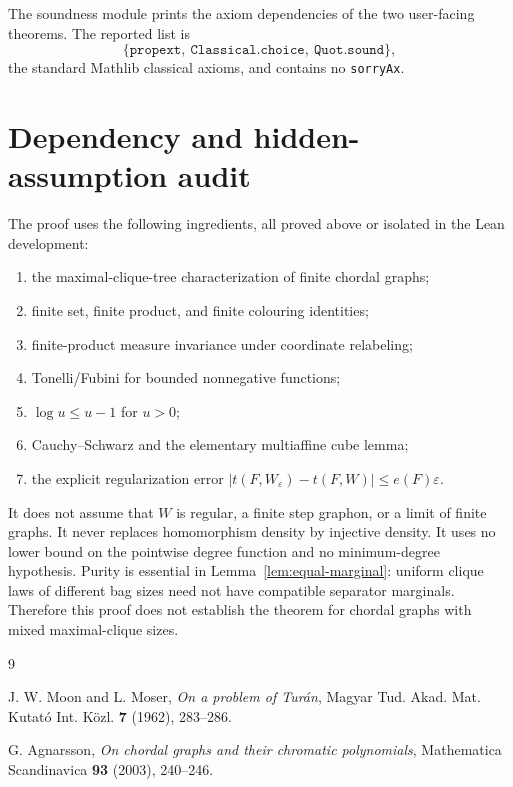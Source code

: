 \documentclass[11pt]{article}
\begin{document}
The soundness module
 prints the axiom
dependencies of the two user-facing theorems.  The reported list is
\[
    \{\texttt{propext},\ \texttt{Classical.choice},\
      \texttt{Quot.sound}\},
\]
the standard Mathlib classical axioms, and contains no \texttt{sorryAx}.

\section{Dependency and hidden-assumption audit}

The proof uses the following ingredients, all proved above or isolated in the
Lean development:
\begin{enumerate}
    \item the maximal-clique-tree characterization of finite chordal graphs;
    \item finite set, finite product, and finite colouring identities;
    \item finite-product measure invariance under coordinate relabeling;
    \item Tonelli/Fubini for bounded nonnegative functions;
    \item \(\log u\le u-1\) for \(u>0\);
    \item Cauchy--Schwarz and the elementary multiaffine cube lemma;
    \item the explicit regularization error
    \(|t(F,W_\varepsilon)-t(F,W)|\le e(F)\varepsilon\).
\end{enumerate}

It does not assume that \(W\) is regular, a finite step graphon, or a limit of
finite graphs.  It never replaces homomorphism density by injective density.
It uses no lower bound on the pointwise degree function and no minimum-degree
hypothesis.  Purity is essential in Lemma~\ref{lem:equal-marginal}: uniform
clique laws of different bag sizes need not have compatible separator
marginals.  Therefore this proof does not establish the theorem for chordal
graphs with mixed maximal-clique sizes.

\begin{thebibliography}{9}

J. W. Moon and L. Moser,
\emph{On a problem of Tur\'{a}n},
Magyar Tud. Akad. Mat. Kutat\'{o} Int. K\"ozl. \textbf{7} (1962), 283--286.

G. Agnarsson,
\emph{On chordal graphs and their chromatic polynomials},
Mathematica Scandinavica \textbf{93} (2003), 240--246.

\end{thebibliography}
\end{document}
